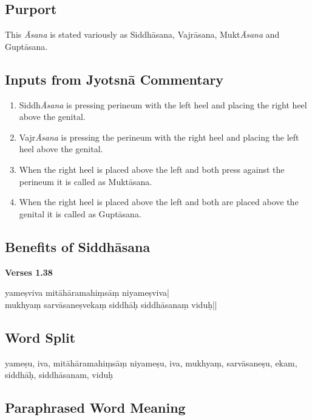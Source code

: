 \subsection*{Purport}
\vspace{-10pt}

This \textit{Āsana} is stated variously as Siddhāsana, Vajrāsana, Mukt\textit{Āsana} and Guptāsana.

\subsection*{Inputs from Jyotsnā Commentary}

\begin{enumerate}
\itemsep=0pt
\item Siddh\textit{Āsana} is pressing perineum with the left heel and placing the right heel above the genital. 
\item Vajr\textit{Āsana} is pressing the perineum with the right heel and placing the left heel above the genital.
\item When the right heel is placed above the left and both press against the perineum it is called as Muktāsana.
\item When the right heel is placed above the left and both are placed above the genital it is called as Guptāsana.
\end{enumerate}
\newpage

\subsection*{Benefits of Siddhāsana}


\noindent \textbf{Verses 1.38}

\begin{shloka}
yameṣviva mitāhāramahiṃsāṃ niyameṣviva|\\
mukhyaṃ sarvāsaneṣvekaṃ siddhāḥ siddhāsanaṃ viduḥ||
\end{shloka}

\subsection*{Word Split}

yameṣu, iva, mitāhāramahiṃsāṃ niyameṣu, iva, mukhyaṃ, sarvāsaneṣu, ekam, siddhāḥ, siddhāsanam, viduḥ

\subsection*{Paraphrased Word Meaning}


